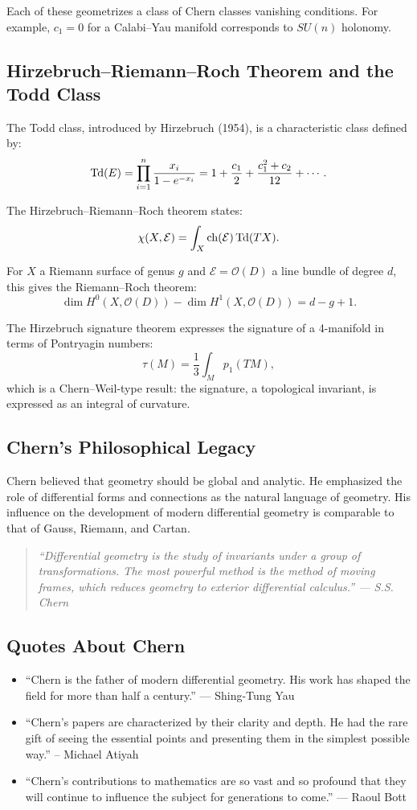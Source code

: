Each of these geometrizes a class of Chern classes vanishing conditions. For example, $c_1 = 0$ for a Calabi--Yau manifold corresponds to $SU(n)$ holonomy.

\subsection*{Hirzebruch--Riemann--Roch Theorem and the Todd Class}

The Todd class, introduced by Hirzebruch (1954), is a characteristic class defined by:
\[
\operatorname{Td}(E) = \prod_{i=1}^n \frac{x_i}{1 - e^{-x_i}} = 1 + \frac{c_1}{2} + \frac{c_1^2 + c_2}{12} + \cdots.
\]

The Hirzebruch--Riemann--Roch theorem states:
\[
\chi(X, \mathcal{E}) = \int_X \operatorname{ch}(\mathcal{E}) \operatorname{Td}(TX).
\]

For $X$ a Riemann surface of genus $g$ and $\mathcal{E} = \mathcal{O}(D)$ a line bundle of degree $d$, this gives the Riemann--Roch theorem:
\[
\dim H^0(X, \mathcal{O}(D)) - \dim H^1(X, \mathcal{O}(D)) = d - g + 1.
\]

The Hirzebruch signature theorem expresses the signature of a 4-manifold in terms of Pontryagin numbers:
\[
\tau(M) = \frac{1}{3} \int_M p_1(TM),
\]
which is a Chern--Weil-type result: the signature, a topological invariant, is expressed as an integral of curvature.

\subsection*{Chern's Philosophical Legacy}

Chern believed that geometry should be global and analytic. He emphasized the role of differential forms and connections as the natural language of geometry. His influence on the development of modern differential geometry is comparable to that of Gauss, Riemann, and Cartan.

\begin{quote}
\it ``Differential geometry is the study of invariants under a group of transformations. The most powerful method is the method of moving frames, which reduces geometry to exterior differential calculus.'' --- S.S. Chern
\end{quote}

\subsection*{Quotes About Chern}

\begin{itemize}
    \item ``Chern is the father of modern differential geometry. His work has shaped the field for more than half a century.'' --- Shing-Tung Yau
    \item ``Chern's papers are characterized by their clarity and depth. He had the rare gift of seeing the essential points and presenting them in the simplest possible way.'' -- Michael Atiyah
    \item ``Chern's contributions to mathematics are so vast and so profound that they will continue to influence the subject for generations to come.'' --- Raoul Bott
\end{itemize}

